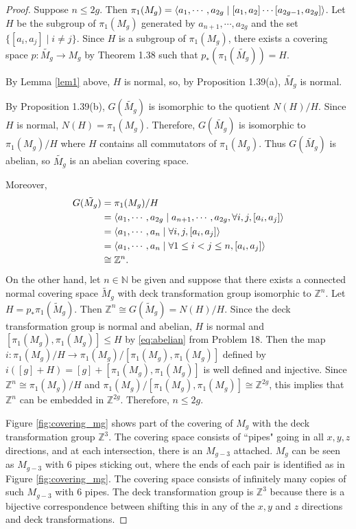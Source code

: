\documentclass[12pt, psamsfonts]{amsart}
\theoremstyle{definition}
\theoremstyle{remark}
\numberwithin{equation}{section}
\begin{document}
\begin{proof}
  Suppose $n \leq 2g$.
  Then $\pi_1(M_g) = \ev{a_1, \cdots, a_{2g} \mid [a_1, a_2] \cdots [a_{2g - 1}, a_{2g}]}$.
  Let $H$ be the subgroup of $\pi_1(M_g)$ generated by $a_{n + 1}, \cdots, a_{2g}$ and the set $\{ [a_i, a_j] \mid i \ne j \}$.
  Since $H$ is a subgroup of $\pi_1(M_g)$, there exists a covering space $p: \tilde{M_g} \rightarrow M_g$ by Theorem 1.38 such that $p_*(\pi_1(\tilde{M_g})) = H$.

  By Lemma \ref{lem1} above, $H$ is normal, so, by Proposition 1.39(a), $\tilde{M_g}$ is normal.

  By Proposition 1.39(b), $G(\tilde{M_g})$ is isomorphic to the quotient $N(H) / H$.
  Since $H$ is normal, $N(H) = \pi_1(M_g)$.
  Therefore, $G(\tilde{M_g})$ is isomorphic to $\pi_1(M_g) / H$ where $H$ contains all commutators of $\pi_1(M_g)$.
  Thus $G(\tilde{M_g})$ is abelian, so $\tilde{M_g}$ is an abelian covering space.

  Moreover,
  \begin{align*}
    G(\tilde{M_g})
      &= \pi_1(M_g) / H \\
      &= \ev{a_1, \cdots, a_{2g} \mid a_{n + 1}, \cdots, a_{2g}, \forall i, j, [a_i, a_j]} \\
      &= \ev{a_{1}, \cdots, a_{n} \mid \forall i, j, [a_i, a_j]} \\
      &= \ev{a_{1}, \cdots, a_{n} \mid \forall 1 \leq i < j \leq n, [a_i, a_j]} \\
      &\cong \mathbb{Z}^n.
  \end{align*}
  On the other hand, let $n \in \mathbb{N}$ be given and suppose that there exists a connected normal covering space $\tilde{M}_g$ with deck transformation group isomorphic to $\mathbb{Z}^n$.
  Let $H = p_*\pi_1(\tilde{M}_g)$.
  Then $\mathbb{Z}^n \cong G(\tilde{M}_g) = N(H) / H$.
  Since the deck transformation group is normal and abelian, $H$ is normal and $[\pi_1(M_g), \pi_1(M_g)] \leq H$ by \eqref{eq:abelian} from Problem 18.  
  Then the map $i: \pi_1(M_g) / H \rightarrow \pi_1(M_g)/[\pi_1(M_g), \pi_1(M_g)]$ defined by $i([g] + H) = [g] + [\pi_1(M_g), \pi_1(M_g)]$ is well defined and injective.
  Since $\mathbb{Z}^n \cong \pi_1(M_g) / H$ and $\pi_1(M_g) / [\pi_1(M_g), \pi_1(M_g)] \cong \mathbb{Z}^{2g}$, this implies that $\mathbb{Z}^n$ can be embedded in $\mathbb{Z}^{2g}$.
  Therefore, $n \leq 2g$.

  Figure \ref{fig:covering_mg} shows part of the covering of $M_g$ with the deck transformation group $\mathbb{Z}^3$.
  The covering space consists of ``pipes" going in all $x, y, z$ directions, and at each intersection, there is an $M_{g - 3}$ attached.
  $M_g$ can be seen as $M_{g - 3}$ with 6 pipes sticking out, where the ends of each pair is identified as in Figure \ref{fig:covering_mg}.
  The covering space consists of infinitely many copies of such $M_{g - 3}$ with 6 pipes.
  The deck transformation group is $\mathbb{Z}^3$ because there is a bijective correspondence between shifting this in any of the $x, y$ and $z$ directions and deck transformations.


\end{proof}
\end{document}
